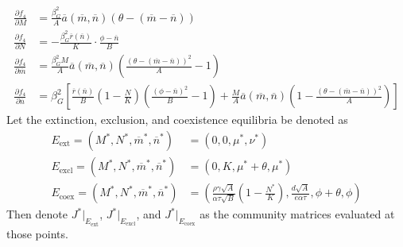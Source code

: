 \documentclass{amsart}
\theoremstyle{definition}
\theoremstyle{remark}
\numberwithin{equation}{section}
\begin{document}
\begin{align*}
	\frac{\partial f_4}{\partial M} &= \frac{\beta_{G}^2}{A}\overline{a}(\overline{m}, \overline{n})(\theta - (\overline{m} - \overline{n})) \\[5px]
	\frac{\partial f_4}{\partial N} &= -\frac{\beta_G^2\overline{r}(\overline{n})}{K}\cdot\frac{\phi - \overline{n}}{B} \\[5px]
	\frac{\partial f_4}{\partial \overline{m}} &= \frac{\beta_G^2M}{A}\overline{a}(\overline{m}, \overline{n})\left(\frac{(\theta - (\overline{m} - \overline{n}))^2}{A} - 1\right)\\[5px]
	\frac{\partial f_4}{\partial \overline{n}} &= \beta_G^2\left[\frac{\overline{r}(\overline{n})}{B}\left(1 - \frac{N}{K}\right)\left(\frac{(\phi - \overline{n})^2}{B} - 1\right) + \frac{M}{A}\overline{a}(\overline{m}, \overline{n})\left(1 - \frac{(\theta - (\overline{m} - \overline{n}))^2}{A}\right)\right]
\end{align*}
Let the extinction, exclusion, and coexistence equilibria be denoted as
\begin{align*}
	E_{\text{ext}} = (M^*, N^*, \overline{m}^*, \overline{n}^*) &= (0, 0, \mu^*, \nu^*)\\
	E_{\text{excl}} = (M^*, N^*, \overline{m}^*, \overline{n}^*) &= (0, K, \mu^* + \theta, \mu^*) \\
	E_{\text{coex}} = (M^*, N^*, \overline{m}^*, \overline{n}^*) &= \left(\frac{\rho\gamma\sqrt{A}}{\alpha\tau\sqrt{B}}\left(1 - \frac{N^*}{K}\right), \frac{d\sqrt{A}}{e\alpha\tau}, \phi + \theta, \phi\right)
\end{align*}
Then denote $J^*|_{E_{\text{ext}}}$, $J^*|_{E_{\text{excl}}}$, and $J^*|_{E_{\text{coex}}}$ as the community matrices evaluated at those points.
\end{document}
